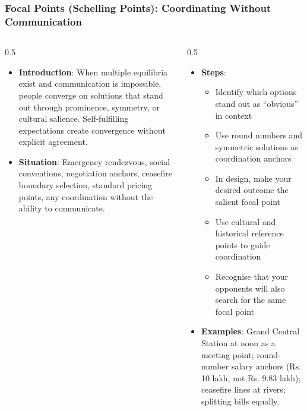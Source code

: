 \begin{frame}[fragile]\frametitle{Focal Points (Schelling Points): Coordinating Without Communication}
\begin{columns}
    \begin{column}[T]{0.5\linewidth}
      \begin{itemize}
        \item \textbf{Introduction}: When multiple equilibria exist and communication is impossible, people converge on solutions that stand out through prominence, symmetry, or cultural salience. Self-fulfilling expectations create convergence without explicit agreement.
        \item \textbf{Situation}: Emergency rendezvous, social conventions, negotiation anchors, ceasefire boundary selection, standard pricing points, any coordination without the ability to communicate.
      \end{itemize}
    \end{column}
    \begin{column}[T]{0.5\linewidth}
      \begin{itemize}
        \item \textbf{Steps}:
        \begin{itemize}
          \item Identify which options stand out as ``obvious'' in context
          \item Use round numbers and symmetric solutions as coordination anchors
          \item In design, make your desired outcome the salient focal point
          \item Use cultural and historical reference points to guide coordination
          \item Recognise that your opponents will also search for the same focal point
        \end{itemize}\item \textbf{Examples}: Grand Central Station at noon as a meeting point; round-number salary anchors (Rs. 10 lakh, not Rs. 9.83 lakh); ceasefire lines at rivers; splitting bills equally.
      \end{itemize}
    \end{column}
  \end{columns}
\end{frame}

